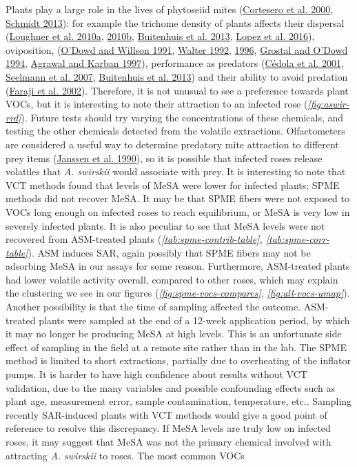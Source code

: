 \documentclass[12pt,final,CPage]{ufthesis}
\begin{document}
{  Plants play a large role in the lives of phytoseiid mites (\protect\hyperlink{ref-Cortesero2000}{Cortesero et al. 2000}, \protect\hyperlink{ref-Schmidt2013}{Schmidt 2013}): for example the trichome density of plants affects their dispersal (\protect\hyperlink{ref-Loughner2010}{Loughner et al. 2010a}, \protect\hyperlink{ref-Loughner2010a}{2010b}, \protect\hyperlink{ref-Buitenhuis2013}{Buitenhuis et al. 2013}, \protect\hyperlink{ref-Lopez2016}{Lopez et al. 2016}), oviposition, (\protect\hyperlink{ref-ODowd1991}{O'Dowd and Willson 1991}, \protect\hyperlink{ref-Walter1992}{Walter 1992}, \protect\hyperlink{ref-Walter1996}{1996}, \protect\hyperlink{ref-Grostal1994}{Grostal and O'Dowd 1994}, \protect\hyperlink{ref-Agrawal1997}{Agrawal and Karban 1997}), performance as predators (\protect\hyperlink{ref-Cedola2001}{Cédola et al. 2001}, \protect\hyperlink{ref-Seelmann2007}{Seelmann et al. 2007}, \protect\hyperlink{ref-Buitenhuis2013}{Buitenhuis et al. 2013}) and their ability to avoid predation (\protect\hyperlink{ref-Faraji2002}{Faraji et al. 2002}). Therefore, it is not unusual to see a preference towards plant VOCs, but it is interesting to note their attraction to an infected rose (\emph{\ref{fig:aswir-rrd}}). Future tests should try varying the concentrations of these chemicals, and testing the other chemicals detected from the volatile extractions. Olfactometers are considered a useful way to determine predatory mite attraction to different prey items (\protect\hyperlink{ref-Janssen1990}{Janssen et al. 1990}), so it is possible that infected roses release volatiles that \emph{A. swirskii} would associate with prey. It is interesting to note that VCT methods found that levels of MeSA were lower for infected plants; SPME methods did not recover MeSA. It may be that SPME fibers were not exposed to VOCs long enough on infected roses to reach equilibrium, or MeSA is very low in severely infected plants. It is also peculiar to see that MeSA levels were not recovered from ASM-treated plants (\emph{\ref{tab:spme-contrib-table}, \ref{tab:spme-corr-table}}). ASM induces SAR, again possibly that SPME fibers may not be adsorbing MeSA in our assays for some reason. Furthermore, ASM-treated plants had lower volatile activity overall, compared to other roses, which may explain the clustering we see in our figures (\emph{\ref{fig:spme-vocs-compares}}, \emph{\ref{fig:all-vocs-umap}}). Another possibility is that the time of sampling affected the outcome. ASM-treated plants were sampled at the end of a 12-week application period, by which it may no longer be producing MeSA at high levels. This is an unfortunate side effect of sampling in the field at a remote site rather than in the lab. The SPME method is limited to short extractions, partially due to overheating of the inflator pumps. It is harder to have high confidence about results without VCT validation, due to the many variables and possible confounding effects such as plant age, measurement error, sample contamination, temperature, etc.. Sampling recently SAR-induced plants with VCT methods would give a good point of reference to resolve this discrepancy. If MeSA levels are truly low on infected roses, it may suggest that MeSA was not the primary chemical involved with attracting \emph{A. swirskii} to roses. The most common VOCs }
\end{document}
